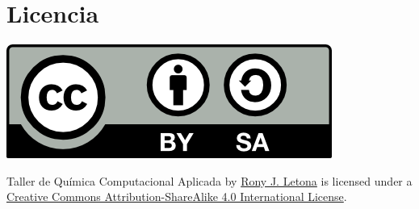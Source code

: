 \documentclass[10pt,letterpaper]{article}
\begin{document}
\section*{Licencia}

\noindent \includegraphics{img/cc_big.png}

\noindent Taller de Qu\'imica Computacional Aplicada by \href{http://github.com/zronyj/TQCA}{Rony J. Letona} is licensed under a \href{http://creativecommons.org/licenses/by-sa/4.0/}{Creative Commons Attribution-ShareAlike 4.0 International License}.
\end{document}
